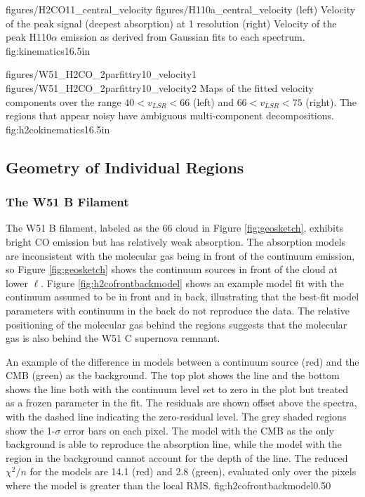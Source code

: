 \FigureTwoAA
{figures/H2CO11_central_velocity}
{figures/H110a_central_velocity}
{(left) Velocity of the peak \formaldehyde \oneone signal (deepest absorption) at
1 \kms resolution
(right) Velocity of the peak H110$\alpha$ emission as derived from Gaussian fits
to each spectrum.}
{fig:kinematics}{1}{6.5in}

\FigureTwoAA
{figures/W51_H2CO_2parfittry10_velocity1}
{figures/W51_H2CO_2parfittry10_velocity2}
{Maps of the fitted \formaldehyde velocity components over the range $40 <
v_{LSR} < 66$ \kms (left) and $66 < v_{LSR} < 75$ \kms (right).  The regions
that appear noisy have ambiguous multi-component decompositions.  }
{fig:h2cokinematics}{1}{6.5in}

\subsection{Geometry of Individual Regions}
\subsubsection{The W51 B Filament}
\label{sec:w51b}
The W51 B filament, labeled as the 66 \kms cloud in Figure \ref{fig:geosketch},
exhibits bright CO emission but has relatively weak \formaldehyde absorption.
The absorption models are inconsistent with the molecular gas being in front of
the continuum emission, so Figure \ref{fig:geosketch} shows the continuum sources
in front of the cloud at lower $\ell$.  Figure \ref{fig:h2cofrontbackmodel}
shows an example model fit with the continuum assumed to be in front and in
back, illustrating that the best-fit model parameters with continuum in the
back do not reproduce the data.
The relative positioning of the molecular gas behind the \hii regions suggests
that the molecular gas is also behind the W51 C supernova remnant.

{An example of the difference in models between a continuum source (red) and
the CMB (green) as the background.  The top plot shows the \oneone line and the
bottom shows the \twotwo line both with the continuum level set to zero in the
plot but treated as a frozen parameter in the fit.  The residuals are shown
offset above the spectra, with the dashed line indicating the zero-residual
level.  The grey shaded regions show the 1-$\sigma$ error bars on each pixel.
The model with the CMB as the only
background is able to reproduce the absorption line, while the model with the
\hii region in the background cannot account for the depth of the \twotwo line.
The reduced $\chi^2/n$ for the models are 14.1 (red) and 2.8 (green), evaluated
only over the pixels where the model is greater than the local RMS.}
{fig:h2cofrontbackmodel}{0.5}{0}


